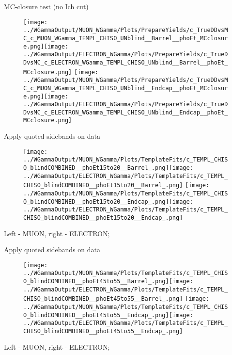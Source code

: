 \documentclass{beamer}
\begin{document}
\begin{frame}{MC-closure test (no Ich cut)}
  \begin{figure}
    \centering
    \texttt{[image: ../WGammaOutput/MUON\_WGamma/Plots/PrepareYields/c\_TrueDDvsMC\_c\_MUON\_WGamma\_TEMPL\_CHISO\_UNblind\_\_Barrel\_\_phoEt\_MCclosure.png]}\texttt{[image: ../WGammaOutput/ELECTRON\_WGamma/Plots/PrepareYields/c\_TrueDDvsMC\_c\_ELECTRON\_WGamma\_TEMPL\_CHISO\_UNblind\_\_Barrel\_\_phoEt\_MCclosure.png]}
    \texttt{[image: ../WGammaOutput/MUON\_WGamma/Plots/PrepareYields/c\_TrueDDvsMC\_c\_MUON\_WGamma\_TEMPL\_CHISO\_UNblind\_\_Endcap\_\_phoEt\_MCclosure.png]}\texttt{[image: ../WGammaOutput/ELECTRON\_WGamma/Plots/PrepareYields/c\_TrueDDvsMC\_c\_ELECTRON\_WGamma\_TEMPL\_CHISO\_UNblind\_\_Endcap\_\_phoEt\_MCclosure.png]}
  \end{figure}
\end{frame}

\begin{frame}{Apply quoted sidebands on data}
  \begin{figure}
    \centering
    \texttt{[image: ../WGammaOutput/MUON\_WGamma/Plots/TemplateFits/c\_TEMPL\_CHISO\_blindCOMBINED\_\_phoEt15to20\_\_Barrel\_.png]}\texttt{[image: ../WGammaOutput/ELECTRON\_WGamma/Plots/TemplateFits/c\_TEMPL\_CHISO\_blindCOMBINED\_\_phoEt15to20\_\_Barrel\_.png]}
    \texttt{[image: ../WGammaOutput/MUON\_WGamma/Plots/TemplateFits/c\_TEMPL\_CHISO\_blindCOMBINED\_\_phoEt15to20\_\_Endcap\_.png]}\texttt{[image: ../WGammaOutput/ELECTRON\_WGamma/Plots/TemplateFits/c\_TEMPL\_CHISO\_blindCOMBINED\_\_phoEt15to20\_\_Endcap\_.png]}
  \end{figure}
  \scriptsize 
  Left - MUON, right - ELECTRON; 
\end{frame}

\begin{frame}{Apply quoted sidebands on data}
  \begin{figure}
    \centering
    \texttt{[image: ../WGammaOutput/MUON\_WGamma/Plots/TemplateFits/c\_TEMPL\_CHISO\_blindCOMBINED\_\_phoEt45to55\_\_Barrel\_.png]}\texttt{[image: ../WGammaOutput/ELECTRON\_WGamma/Plots/TemplateFits/c\_TEMPL\_CHISO\_blindCOMBINED\_\_phoEt45to55\_\_Barrel\_.png]}
    \texttt{[image: ../WGammaOutput/MUON\_WGamma/Plots/TemplateFits/c\_TEMPL\_CHISO\_blindCOMBINED\_\_phoEt45to55\_\_Endcap\_.png]}\texttt{[image: ../WGammaOutput/ELECTRON\_WGamma/Plots/TemplateFits/c\_TEMPL\_CHISO\_blindCOMBINED\_\_phoEt45to55\_\_Endcap\_.png]}
  \end{figure}
  \scriptsize 
  Left - MUON, right - ELECTRON; 
\end{frame}
\end{document}
